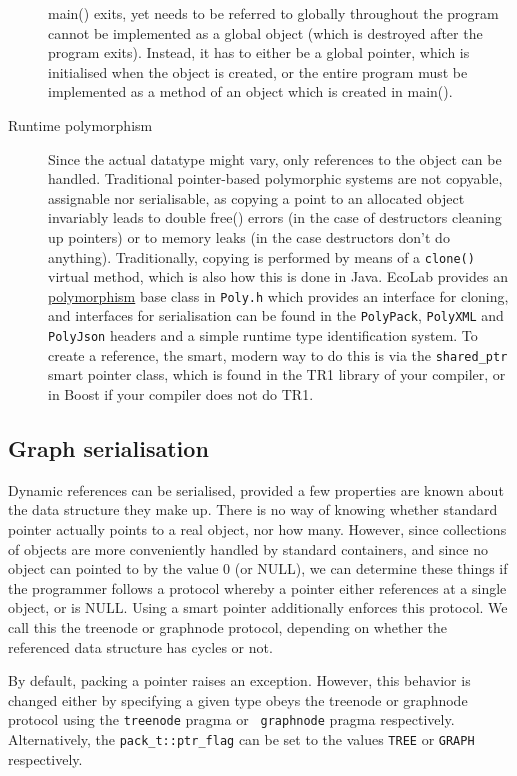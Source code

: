 \begin{description}
  main() exits, yet needs to be referred to globally throughout the
  program cannot be implemented as a global object (which is destroyed
  after the program exits). Instead, it has to either be a global
  pointer, which is initialised when the object is created, or the
  entire program must be implemented as a method of an object which is
  created in main().
\item [Runtime polymorphism] Since the actual datatype might vary,
  only references to the object can be handled. Traditional
  pointer-based polymorphic systems are not copyable, assignable nor
  serialisable, as copying a point to an allocated object invariably
  leads to double free() errors (in the case of destructors cleaning
  up pointers) or to memory leaks (in the case destructors don't do
  anything). Traditionally, copying is performed by means of a
  \verb+clone()+ virtual method, which is also how this is done in
  Java. EcoLab provides an  \hyperref{PolyBase}{ (see
    \S}{)}{polymorphism} base class in \verb+Poly.h+ which
  provides an interface for cloning, and interfaces for serialisation
  can be found in the \verb+PolyPack+, \verb+PolyXML+ and
  \verb+PolyJson+ headers and a simple
  runtime type identification system. To create a reference, the
  smart, modern way to do this is via the \verb+shared_ptr+ smart
  pointer class, which is found in the TR1 library of your compiler,
  or in Boost if your compiler does not do TR1.
\end{description}

\subsection{Graph serialisation}

Dynamic references can be serialised, provided a few properties are
known about the data structure they make up. There is no way of
knowing whether standard pointer actually points to a real object, nor
how many. However, since collections of objects are more conveniently
handled by standard containers, and since no object can pointed to by
the value 0 (or NULL), we can determine these things if the programmer
follows a protocol whereby a pointer either references at a single
object, or is NULL. Using a smart pointer additionally enforces this
protocol. We call this the treenode or graphnode protocol, depending
on whether the referenced data structure has cycles or not.

By default, packing a pointer raises an exception. However, this
behavior is changed either by specifying a given type obeys the
treenode or graphnode protocol using the {\tt treenode}
pragma or {\tt
graphnode} pragma
respectively. Alternatively, the \verb+pack_t::ptr_flag+ can be set to
the values \verb+TREE+ or \verb+GRAPH+ respectively.

